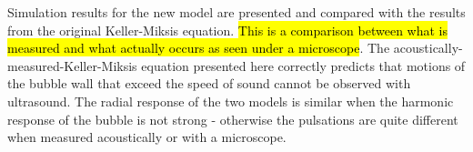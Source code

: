 Simulation results for the new model are presented and compared with the results from the original Keller-Miksis equation.
\hl{This is a comparison between what is measured and what actually occurs as seen under a microscope}.
The acoustically-measured-Keller-Miksis equation presented here correctly predicts 
that motions of the bubble wall that exceed the speed of sound cannot be observed with ultrasound.
The radial response of the two models is similar when the harmonic response of the bubble is not strong -
otherwise the pulsations are quite different when measured acoustically or with a microscope.






